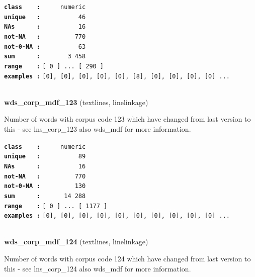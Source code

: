 \documentclass[]{article}
\begin{document}
\textbf{\texttt{class\ \ \ \ :}} \texttt{~~~~~numeric}\\
\textbf{\texttt{unique\ \ \ :}} \texttt{~~~~~~~~~~46}\\
\textbf{\texttt{NAs\ \ \ \ \ \ :}} \texttt{~~~~~~~~~~16}\\
\textbf{\texttt{not-NA\ \ \ :}} \texttt{~~~~~~~~~770}\\
\textbf{\texttt{not-0-NA\ :}} \texttt{~~~~~~~~~~63}\\
\textbf{\texttt{sum\ \ \ \ \ \ :}} \texttt{~~~~~~~3~458}\\
\textbf{\texttt{range\ \ \ \ :}}
\texttt{{[}\ 0\ {]}\ ...\ {[}\ 290\ {]}}\\
\textbf{\texttt{examples\ :}}
\texttt{{[}0{]},\ {[}0{]},\ {[}0{]},\ {[}0{]},\ {[}0{]},\ {[}8{]},\ {[}0{]},\ {[}0{]},\ {[}0{]},\ {[}0{]}\ ...}\\

~

\textbf{wds\_corp\_mdf\_123} (textlines, linelinkage)

Number of words with corpus code 123 which have changed from last
version to this - see lns\_corp\_123 also wds\_mdf for more information.

\textbf{\texttt{class\ \ \ \ :}} \texttt{~~~~~numeric}\\
\textbf{\texttt{unique\ \ \ :}} \texttt{~~~~~~~~~~89}\\
\textbf{\texttt{NAs\ \ \ \ \ \ :}} \texttt{~~~~~~~~~~16}\\
\textbf{\texttt{not-NA\ \ \ :}} \texttt{~~~~~~~~~770}\\
\textbf{\texttt{not-0-NA\ :}} \texttt{~~~~~~~~~130}\\
\textbf{\texttt{sum\ \ \ \ \ \ :}} \texttt{~~~~~~14~288}\\
\textbf{\texttt{range\ \ \ \ :}}
\texttt{{[}\ 0\ {]}\ ...\ {[}\ 1177\ {]}}\\
\textbf{\texttt{examples\ :}}
\texttt{{[}0{]},\ {[}0{]},\ {[}0{]},\ {[}0{]},\ {[}0{]},\ {[}0{]},\ {[}0{]},\ {[}0{]},\ {[}0{]},\ {[}0{]}\ ...}\\

~

\textbf{wds\_corp\_mdf\_124} (textlines, linelinkage)

Number of words with corpus code 124 which have changed from last
version to this - see lns\_corp\_124 also wds\_mdf for more information.
\end{document}
